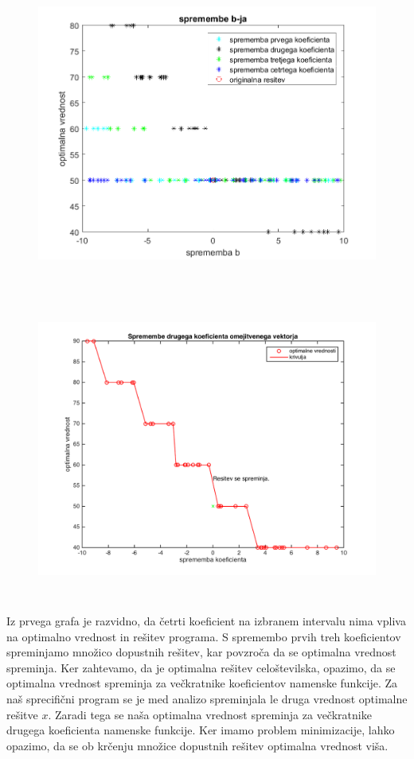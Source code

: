 \documentclass[a4paper,12pt]{article}
\begin{document}
\begin{figure}[h]
\includegraphics[width=14cm,height=10cm]{spremembe_b.png}
\end{figure}
\begin{figure}[h]
\includegraphics[width=14cm,height=10cm]{spremembe_b2.png}
\end{figure}

Iz prvega grafa je razvidno, da četrti koeficient na izbranem intervalu nima vpliva na optimalno vrednost in rešitev programa. S spremembo prvih treh koeficientov spreminjamo množico dopustnih rešitev, kar povzroča da se optimalna vrednost spreminja. Ker zahtevamo, da je optimalna rešitev celoštevilska, opazimo, da se optimalna vrednost spreminja za večkratnike koeficientov namenske funkcije. Za naš sprecifični program se je med analizo spreminjala le druga vrednost optimalne rešitve $x$. Zaradi tega se naša optimalna vrednost spreminja za večkratnike drugega koeficienta namenske funkcije. 
Ker imamo problem minimizacije, lahko opazimo, da se ob krčenju množice dopustnih rešitev optimalna vrednost viša. 
\end{document}
